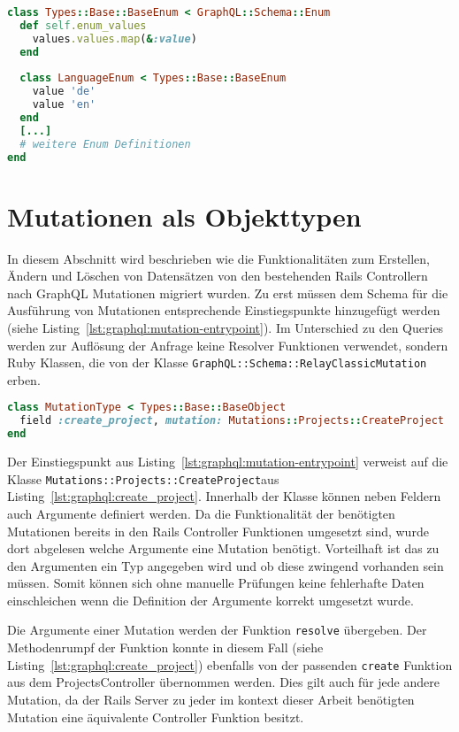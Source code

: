\begin{lstlisting}[language=Ruby,float=h!,caption={Funktion zum Extrahieren der Enum Werte in ein Array. \lstinline|/graphql/types/base/base_enum.rb|}, label={lst:graphql:enum_values}]
class Types::Base::BaseEnum < GraphQL::Schema::Enum
  def self.enum_values
    values.values.map(&:value)
  end
  
  class LanguageEnum < Types::Base::BaseEnum
    value 'de'
    value 'en'
  end
  [...]
  # weitere Enum Definitionen
end
\end{lstlisting}

\section{Mutationen als Objekttypen}
In diesem Abschnitt wird beschrieben wie die Funktionalitäten zum Erstellen, Ändern und Löschen von Datensätzen von den bestehenden Rails Controllern nach GraphQL Mutationen migriert wurden.
Zu erst müssen dem Schema für die Ausführung von Mutationen entsprechende Einstiegspunkte hinzugefügt werden (siehe Listing~\ref{lst:graphql:mutation-entrypoint}). Im Unterschied zu den Queries werden zur Auflösung der Anfrage keine Resolver Funktionen verwendet, sondern Ruby Klassen, die von der Klasse \lstinline|GraphQL::Schema::RelayClassicMutation| erben. 

\begin{lstlisting}[language=Ruby,float=h!,caption={Definition eines Endpunktes zum Aufruf der Mutation für Erstellung eines Projektes \lstinline|/graphql/types/mutation_type.rb|}, label={lst:graphql:mutation-entrypoint}]
class MutationType < Types::Base::BaseObject
  field :create_project, mutation: Mutations::Projects::CreateProject
end
\end{lstlisting}

Der Einstiegspunkt aus Listing~\ref{lst:graphql:mutation-entrypoint} verweist auf die Klasse \lstinline|Mutations::Projects::CreateProject|aus Listing~\ref{lst:graphql:create_project}. Innerhalb der Klasse können neben Feldern auch Argumente definiert werden. Da die Funktionalität der benötigten Mutationen bereits in den Rails Controller Funktionen umgesetzt sind, wurde dort abgelesen welche Argumente eine Mutation benötigt. 
Vorteilhaft ist das zu den Argumenten ein Typ angegeben wird und ob diese zwingend vorhanden sein müssen. Somit können sich ohne manuelle Prüfungen keine fehlerhafte Daten einschleichen wenn die Definition der Argumente korrekt umgesetzt wurde.

Die Argumente einer Mutation werden der Funktion \lstinline|resolve| übergeben. Der Methodenrumpf der Funktion konnte in diesem Fall (siehe Listing~\ref{lst:graphql:create_project}) ebenfalls von der passenden \lstinline|create| Funktion aus dem ProjectsController übernommen werden. Dies gilt auch für jede andere Mutation, da der Rails Server zu jeder im kontext dieser Arbeit benötigten Mutation eine äquivalente Controller Funktion besitzt.

